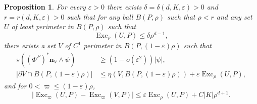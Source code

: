 \documentclass[reqno,10pt]{amsart}
\DeclareMathOperator{\Exc}{Exc}
\newcommand{\normal}{\mathbf n}
\newtheorem{proposition}[theorem]{Proposition}
\theoremstyle{definition}
\numberwithin{equation}{section}
\begin{document}
\begin{proposition}\label{single mollify}
For every $\varepsilon > 0$ there exists $\delta = \delta(d, K, \varepsilon) > 0$ and $r = r(d, K, \varepsilon) > 0$ such that for any ball $B(P, \rho)$ such that $\rho < r$ and any set $U$ of least perimeter in $B(P, \rho)$ such that
$$\Exc_\rho (U, P) \leq \delta \rho^{d - 1},$$
there exists a set $V$ of $C^1$ perimeter in $B(P, (1 - \varepsilon)\rho)$ such that
\begin{align}
\star((\Phi^P)^* \normal_V \wedge \psi) &\geq (1 - o(\varepsilon^2))|\psi|, \label{single mollify normal}\\
|\partial V \cap B(P, (1 - \varepsilon)\rho)| &\leq \eta(V, B(P, (1 - \varepsilon)\rho)) + \varepsilon \Exc_\rho (U, P), \label{single mollify minimality}
\end{align}
and for $0 < \varpi \leq (1 - \varepsilon)\rho$,
\begin{equation}
|\Exc_\varpi (U, P) - \Exc_\varpi (V, P)| \leq \varepsilon \Exc_\rho (U, P) + C|K| \rho^{d + 1}. \label{single mollify excess}
\end{equation}
\end{proposition}
\end{document}

